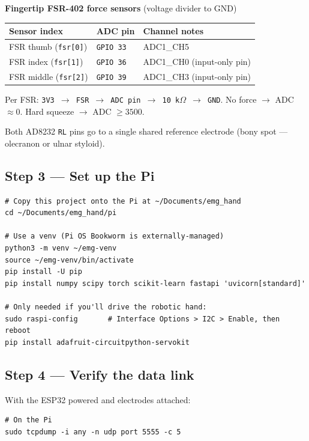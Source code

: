 \documentclass[10pt, a4paper]{article}
\begin{document}
\vspace{8pt}
\noindent\textbf{Fingertip FSR-402 force sensors} (voltage divider to GND)
\begin{tabularx}{\linewidth}{@{}l l X@{}}
\toprule
\textbf{Sensor index} & \textbf{ADC pin} & \textbf{Channel notes} \\
\midrule
FSR thumb  (\texttt{fsr[0]})  & \texttt{GPIO 33} & ADC1\_CH5 \\
FSR index  (\texttt{fsr[1]})  & \texttt{GPIO 36} & ADC1\_CH0 (input-only pin) \\
FSR middle (\texttt{fsr[2]})  & \texttt{GPIO 39} & ADC1\_CH3 (input-only pin) \\
\bottomrule
\end{tabularx}

\vspace{6pt}
\noindent Per FSR: \texttt{3V3 $\rightarrow$ FSR $\rightarrow$ ADC pin $\rightarrow$ 10\,k$\Omega$ $\rightarrow$ GND}. No force $\rightarrow$ ADC $\approx 0$. Hard squeeze $\rightarrow$ ADC $\geq 3500$.

\vspace{4pt}
Both AD8232 \texttt{RL} pins go to a single shared reference electrode (bony spot --- olecranon or ulnar styloid).

\subsection*{Step 3 --- Set up the Pi}

\begin{lstlisting}
# Copy this project onto the Pi at ~/Documents/emg_hand
cd ~/Documents/emg_hand/pi

# Use a venv (Pi OS Bookworm is externally-managed)
python3 -m venv ~/emg-venv
source ~/emg-venv/bin/activate
pip install -U pip
pip install numpy scipy torch scikit-learn fastapi 'uvicorn[standard]'

# Only needed if you'll drive the robotic hand:
sudo raspi-config       # Interface Options > I2C > Enable, then reboot
pip install adafruit-circuitpython-servokit
\end{lstlisting}

\subsection*{Step 4 --- Verify the data link}

With the ESP32 powered and electrodes attached:

\begin{lstlisting}
# On the Pi
sudo tcpdump -i any -n udp port 5555 -c 5
\end{lstlisting}
\end{document}
